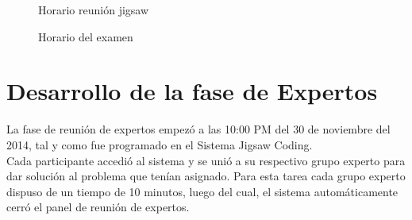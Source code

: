 \begin{figure}
	\centering
	\caption{Horario reunión jigsaw}
	\label{fig:c5_horario_reunion_jigsaw}
\end{figure}

\begin{figure}
	\centering
	\caption{Horario del examen}
	\label{fig:c5_horario_examen}
\end{figure}

\section{Desarrollo de la fase de Expertos}
La fase de reunión de expertos empezó a las 10:00 PM del 30 de noviembre del 2014, tal y como fue programado en el Sistema Jigsaw Coding.\\

Cada participante accedió al sistema y se unió a su respectivo grupo experto para dar solución al problema que tenían asignado. Para esta tarea cada grupo experto dispuso de un tiempo de 10 minutos, luego del cual, el sistema automáticamente cerró el panel de reunión de expertos.\\

